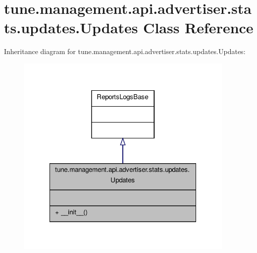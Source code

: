 \hypertarget{classtune_1_1management_1_1api_1_1advertiser_1_1stats_1_1updates_1_1Updates}{\section{tune.\-management.\-api.\-advertiser.\-stats.\-updates.\-Updates Class Reference}
\label{classtune_1_1management_1_1api_1_1advertiser_1_1stats_1_1updates_1_1Updates}
}


Inheritance diagram for tune.\-management.\-api.\-advertiser.\-stats.\-updates.\-Updates\-:
\nopagebreak
\begin{figure}[H]
\begin{center}
\leavevmode
\includegraphics[width=300pt]{classtune_1_1management_1_1api_1_1advertiser_1_1stats_1_1updates_1_1Updates__inherit__graph}
\end{center}
\end{figure}


